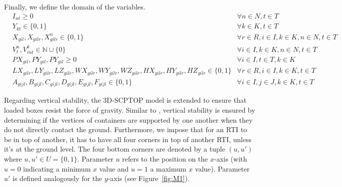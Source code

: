 
Finally, we define the domain of the variables.
\begin{align}
   & I_{nt}\geq 0                                                                                                    & \forall n\in N, t \in T                          \\
   & Y_{kt} \in \lbrace0, 1\rbrace                                                                                   & \forall k \in K , t \in T                        \\
   & X_{gil}, X_{gilr}, X^n_{gilr} \in \lbrace0,1\rbrace                                                             & \forall r\in R, i \in I, k\in K, n\in N, t \in T \\
   & V^n_t, V^k_{int} \in \mathbb{N} \cup \lbrace 0 \rbrace                                                          & \forall i \in I, k \in K, n \in N, t \in T       \\
   & PX_{gil}, PY_{gil}, PY_{gil}\geq 0                                                                              & \forall i\in I, t\in T, k\in K                   \\
   & L X_{gilr},L Y_{gilr},L Z_{gilr}, W X_{gilr},W Y_{gilr}, WZ_{gilr} , H X_{gilr},H Y_{gilr},HZ_{gilr} \in\{0,1\} & \forall r\in R, i \in I, k \in K, t\in T         \\
   & A_{g i j l}, B_{g i j l},C_{g i j l}, D_{g i j l}, E_{g i j l}, F_{g i j l}\in\{0,1\}                           & \forall i\in I, j\in J, k\in K, t\in T
\end{align}

Regarding vertical stability, the 3D-SCPTOP model is extended to ensure that loaded boxes resist the force of gravity. Similar to \autocite{2016Paquay}, vertical stability is ensured by determining if the vertices of containers are supported by one another when they do not directly contact the ground. Furthermore, we impose that for an RTI to be in top of another, it has to have all four corners in top of another RTI, unless it's at the ground level. The four bottom corners are denoted by a tuple \((u,u')\) where \(u,u' \in U = \{0,1\}\). Parameter \(u\) refers to the position on the \(x\)-axis (with \(u=0\) indicating a minimum \(x\) value and \(u=1\) a maximum \(x\) value). Parameter \(u'\) is defined analogously for the \(y\)-axis (see Figure~\ref{fig:M1}).

